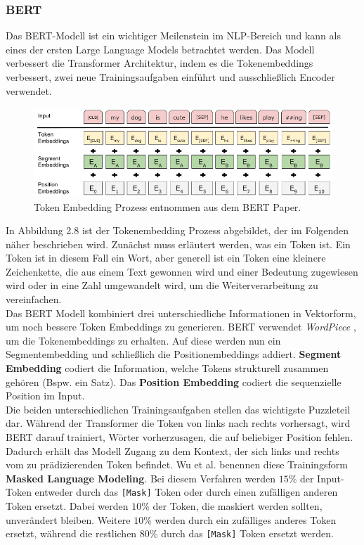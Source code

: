 \documentclass[12pt,letterpaper,ngerman]{article}
\begin{document}
\subsubsection{BERT}
Das BERT-Modell \cite{devlin2019bertpretrainingdeepbidirectional}
ist ein wichtiger Meilenstein im NLP-Bereich und kann 
als eines der ersten Large Language Models betrachtet werden.
Das Modell verbessert die Transformer Architektur, 
indem es die Tokenembeddings verbessert, zwei neue Trainingsaufgaben einführt
und ausschließlich Encoder verwendet.
\begin{figure}[H]
  \begin{center}
    \includegraphics[scale=0.5]{abb/BERT-Tokens.png}
  \end{center}
  \caption{Token Embedding Prozess entnommen aus dem BERT Paper.}
\end{figure}
In Abbildung 2.8 ist der Tokenembedding Prozess abgebildet,
der im Folgenden näher beschrieben wird. Zunächst muss erläutert werden, 
was ein Token ist. Ein Token ist in diesem Fall ein Wort, 
aber generell ist ein Token eine kleinere Zeichenkette, die aus einem 
Text gewonnen wird und einer Bedeutung zugewiesen wird oder in eine 
Zahl umgewandelt wird, um die Weiterverarbeitung zu vereinfachen.\\

Das BERT Modell kombiniert drei unterschiedliche Informationen
in Vektorform, um noch bessere Token Embeddings zu generieren. BERT
verwendet \textit{WordPiece} \cite{wu2016googlesneuralmachinetranslation},
um die Tokenembeddings zu erhalten.
Auf diese werden nun ein Segmentembedding und schließlich die
Positionembeddings addiert. {\bf Segment Embedding} codiert die Information,
welche Tokens strukturell zusammen gehören (Bspw. ein Satz).
Das {\bf Position Embedding} codiert die sequenzielle Position im Input.\\


Die beiden unterschiedlichen Trainingsaufgaben stellen das wichtigste
Puzzleteil dar. Während der Transformer die Token von links nach rechts
vorhersagt, wird BERT darauf trainiert, Wörter vorherzusagen, die auf
beliebiger Position fehlen. Dadurch erhält das Modell Zugang zu dem
Kontext, der sich links und rechts vom zu prädizierenden Token befindet.
Wu et al. benennen diese Trainingsform {\bf Masked Language Modeling}.
Bei diesem Verfahren werden $15 \%$ der Input-Token entweder durch das
\verb|[Mask]| Token oder durch einen zufälligen anderen Token ersetzt.
Dabei werden $10 \%$ der Token, die maskiert werden sollten,
unverändert bleiben. Weitere $10 \%$ werden durch ein zufälliges anderes
Token ersetzt, während die restlichen $80 \%$ durch das \verb|[Mask]| Token 
ersetzt werden.
\pagebreak
\end{document}
